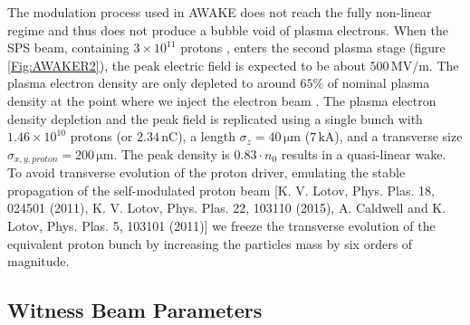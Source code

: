 \documentclass[aps,prstab,reprint,amsmath,amssymb,groupedaddress,onecolumn]{revtex4-1}
\newcommand{\unit}[1]{\,\mathrm{#1}}
\newcommand{\funit}[2]{\,\mathrm{#1}/\mathrm{#2}}
\newcommand{\nexp}[1]{\times 10^{#1}}
\begin{document}

The modulation process used in AWAKE does not reach the fully non-linear regime and thus does not produce a bubble void of plasma electrons. When
the SPS beam, containing $3\nexp{11}$ protons \cite{gschwendtner:2016}, enters the second plasma stage (figure \ref{Fig:AWAKER2}), the peak
electric field is expected to be about $500\funit{MV}{m}$. The plasma electron density are only depleted to around $65\%$ of
nominal plasma density at the point where we inject the electron beam \cite{awake_collaboration:2016}.  The plasma electron density depletion and the peak field is replicated using a single %
bunch with $1.46\nexp{10}$ protons (or $2.34\unit{nC}$), a %
length $\sigma_{z} = 40\unit{\mu m}$ ($7\unit{kA}$), and a transverse size $\sigma_{x,y,proton} = 200\unit{\mu m}$.   The peak density is $0.83\cdot n_{0}$ results in a quasi-linear wake. %
To avoid transverse evolution of the proton driver, emulating the stable propagation of the self-modulated proton beam [K. V. Lotov, Phys. Plas. 18, 024501 (2011), K. V. Lotov, Phys. Plas. 22, 103110 (2015), A. Caldwell and K. Lotov, Phys. Plas. 5, 103101 (2011)] we freeze the transverse evolution of the equivalent proton bunch by increasing the particles mass by six orders of magnitude.

\subsection{Witness Beam Parameters}\label{S:M:Setup}
\end{document}

